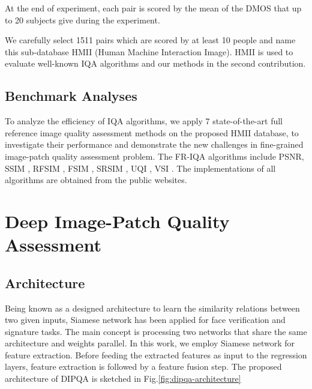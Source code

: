 At the end of experiment, each pair is scored by the mean of the DMOS that up to 20 subjects give during the experiment.

We carefully select 1511 pairs which are scored by at least 10 people and name this sub-database HMII (Human Machine Interaction Image). HMII is used to evaluate well-known IQA algorithms and our methods in the second contribution. 

\subsection{Benchmark Analyses}

To analyze the efficiency of IQA algorithms, we apply 7 state-of-the-art full reference image quality assessment
methods on the proposed HMII database, to investigate
their performance and demonstrate the new challenges in
fine-grained image-patch quality assessment problem. The FR-IQA algorithms include PSNR, SSIM \cite{Wang2004}, RFSIM \cite{Zhang2010}, FSIM \cite{Zhang2011}, SRSIM \cite{Zhang2012}, UQI \cite{Wang2002}, VSI \cite{Zhang2014}. The implementations of all algorithms are obtained from the public websites. 

\section{Deep Image-Patch Quality Assessment}

\subsection{Architecture}

Being known as a designed architecture to learn the similarity relations between two given inputs, Siamese network has been applied for face verification \cite{Chopra2005} and signature \cite{BROMLEY2004} tasks. The main concept is processing two networks that share the same architecture and weights parallel. In this work, we employ Siamese network for feature extraction. Before feeding the extracted features as input to the regression layers, feature extraction is followed by a feature fusion step. The proposed architecture of DIPQA is sketched in Fig.\ref{fig:dipqa-architecture}


